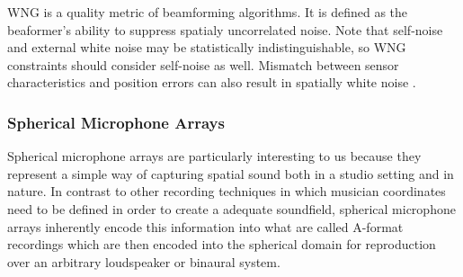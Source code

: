 
WNG is a quality metric of beamforming algorithms. It is defined as the beaformer's ability to suppress spatialy uncorrelated noise. Note that self-noise and external white noise may be statistically indistinguishable, so WNG constraints should consider self-noise as well. Mismatch between sensor characteristics and position errors can also result in spatially white noise \cite{mabande2009design}.  





\subsubsection{Spherical Microphone Arrays}

Spherical microphone arrays are particularly interesting to us because they represent a simple way of capturing spatial sound both in a studio setting and in nature. In contrast to other recording techniques in which musician coordinates need to be defined in order to create a adequate soundfield, spherical microphone arrays inherently encode this information into what are called A-format recordings which are then encoded into the spherical domain for reproduction over an arbitrary loudspeaker or binaural system. 

